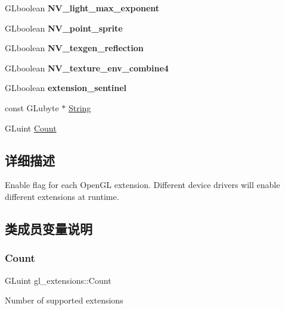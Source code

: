 \begin{DoxyCompactItemize}
G\+Lboolean {\bfseries N\+V\+\_\+light\+\_\+max\+\_\+exponent}
\item 
\mbox{\label{structgl__extensions_a9dc386281693e9cc1d60eabeef03f151}} 
G\+Lboolean {\bfseries N\+V\+\_\+point\+\_\+sprite}
\item 
\mbox{\label{structgl__extensions_af4ad5f9daba85b34376efacf7b5333d5}} 
G\+Lboolean {\bfseries N\+V\+\_\+texgen\+\_\+reflection}
\item 
\mbox{\label{structgl__extensions_a3b04805f25baeb5ca118df6f90d66d4d}} 
G\+Lboolean {\bfseries N\+V\+\_\+texture\+\_\+env\+\_\+combine4}
\item 
\mbox{\label{structgl__extensions_af6c128c6f40656be089b1117c5c3d865}} 
G\+Lboolean {\bfseries extension\+\_\+sentinel}
\item 
const G\+Lubyte $\ast$ \hyperlink{structgl__extensions_a58814dcf3c62378aa825290295f3365c}{String}
\item 
G\+Luint \hyperlink{structgl__extensions_a84a3e9024982eeea0f7164fe01f0271d}{Count}
\end{DoxyCompactItemize}


\subsection{详细描述}
Enable flag for each Open\+GL extension. Different device drivers will enable different extensions at runtime. 

\subsection{类成员变量说明}
\mbox{\label{structgl__extensions_a84a3e9024982eeea0f7164fe01f0271d}} 
\subsubsection{\texorpdfstring{Count}{Count}}
{\footnotesize\ttfamily G\+Luint gl\+\_\+extensions\+::\+Count}

Number of supported extensions \mbox{\label{structgl__extensions_a58814dcf3c62378aa825290295f3365c}} 
